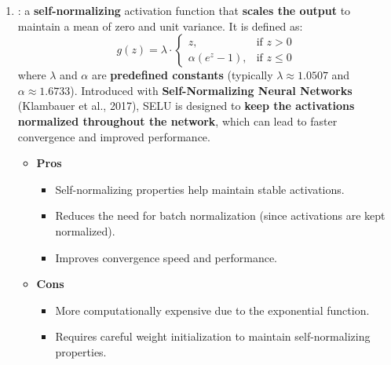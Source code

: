 \begin{enumerate}
    \item {}: a \textbf{self-normalizing} activation function that \textbf{scales the output} to maintain a mean of zero and unit variance. It is defined as:
    \begin{equation}
        g\left(z\right) = \lambda \cdot \begin{cases}
            z, & \text{if } z > 0 \\
            \alpha \left(e^{z} - 1\right), & \text{if } z \leq 0
        \end{cases}
    \end{equation}
    where $\lambda$ and $\alpha$ are \textbf{predefined constants} (typically $\lambda \approx 1.0507$ and $\alpha \approx 1.6733$). Introduced with \textbf{Self-Normalizing Neural Networks} (Klambauer et al., 2017), SELU is designed to \textbf{keep the activations normalized throughout the network}, which can lead to faster convergence and improved performance.
    \begin{itemize}
        \item[\textcolor{Green3}{\faIcon{check-circle}}] \textcolor{Green3}{\textbf{Pros}}
        \begin{itemize}
            \item[\textcolor{Green3}{\faIcon{check}}] Self-normalizing properties help maintain stable activations.
            \item[\textcolor{Green3}{\faIcon{check}}] Reduces the need for batch normalization (since activations are kept normalized).
            \item[\textcolor{Green3}{\faIcon{check}}] Improves convergence speed and performance.
        \end{itemize}
        \item[\textcolor{Red2}{\faIcon{times-circle}}] \textcolor{Red2}{\textbf{Cons}}
        \begin{itemize}
            \item[\textcolor{Red2}{\faIcon{times}}] More computationally expensive due to the exponential function.
            \item[\textcolor{Red2}{\faIcon{times}}] Requires careful weight initialization to maintain self-normalizing properties.
        \end{itemize}
    \end{itemize}
\end{enumerate}

